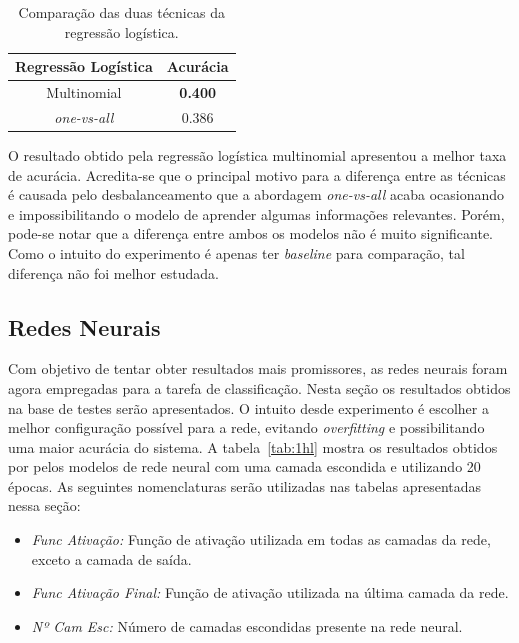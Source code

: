 \documentclass[conference]{IEEEtran}
\begin{document}
\begin{table}[h!]
	\centering
	
	\begin{tabular}{cc} \toprule
		\textbf{Regressão Logística} & \textbf{Acurácia} \\ \toprule 	
		Multinomial		          & \textbf{0.400}    \\
		\emph{one-vs-all}         & 0.386             \\ \bottomrule
	\end{tabular}
	\caption{Comparação das duas técnicas da regressão logística.}
 	\label{tab:reg}
\end{table}

O resultado obtido pela regressão logística multinomial apresentou a melhor taxa de acurácia. Acredita-se que o principal motivo para a diferença entre as técnicas é causada pelo desbalanceamento que a abordagem \emph{one-vs-all} acaba ocasionando e impossibilitando o modelo de aprender algumas informações relevantes. Porém, pode-se notar que a diferença entre ambos os modelos não é muito significante. Como o intuito do experimento é apenas ter \emph{baseline} para comparação, tal diferença não foi melhor estudada.


\subsection{Redes Neurais}

Com objetivo de tentar obter resultados mais promissores, as redes neurais foram agora empregadas para a tarefa de classificação. Nesta seção os resultados obtidos na base de testes serão apresentados. O intuito desde experimento é escolher a melhor configuração possível para a rede, evitando \emph{overfitting} e possibilitando uma maior acurácia do sistema. A tabela~\ref{tab:1hl} mostra os resultados obtidos por pelos modelos de rede neural com uma camada escondida e utilizando 20 épocas. As seguintes nomenclaturas serão utilizadas nas tabelas apresentadas nessa seção:

\begin{itemize}
	\item \emph{Func Ativação:} Função de ativação utilizada em todas as camadas da rede, exceto a camada de saída.
	
	\item \emph{Func Ativação Final:} Função de ativação utilizada na última camada da rede.
	
	\item \emph{Nº Cam Esc:} Número de camadas escondidas presente na rede neural.
\end{itemize}
\end{document}
